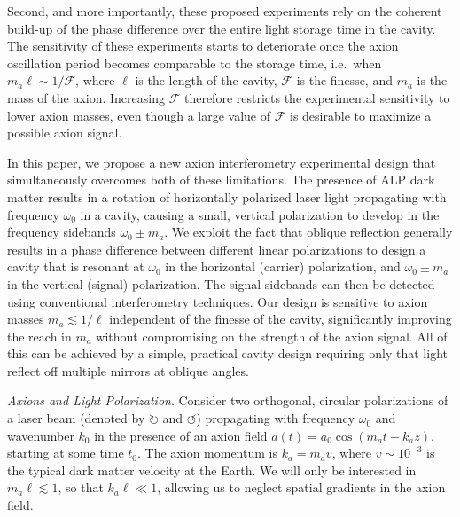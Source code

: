 \documentclass[aps,prd,nofootinbib,twocolumn,superscriptaddress,preprintnumbers,letterpaper, longbibliography]{revtex4-1}
\def\polarc{horizontal }
\def\polars{vertical }
\def\polarcly{horizontally }
\begin{document}
Second, and more importantly, these proposed experiments rely on the coherent build-up of the phase difference over the entire light storage time in the cavity. The sensitivity of these experiments starts to deteriorate once the axion oscillation period becomes comparable to the storage time, i.e.\ when $m_a \ell \sim 1/\mathcal{F}$, where $\ell$ is the length of the cavity, $\mathcal{F}$ is the finesse, and $m_a$ is the mass of the axion. Increasing $\mathcal{F}$ therefore restricts the experimental sensitivity to lower axion masses, even though a large value of $\mathcal{F}$ is desirable to maximize a possible axion signal. 

In this paper, we propose a new axion interferometry experimental design that simultaneously overcomes both of these limitations. The presence of ALP dark matter results in a rotation of \polarcly polarized laser light propagating with frequency $\omega_0$ in a cavity, causing a small, \polars polarization to develop in the frequency sidebands $\omega_0 \pm m_a$. We exploit the fact that oblique reflection generally results in a phase difference between different linear polarizations to design a cavity that is resonant at $\omega_0$ in the \polarc (carrier) polarization, and $\omega_0 \pm m_a$ in the \polars (signal) polarization. The signal sidebands can then be detected using conventional interferometry techniques. Our design is sensitive to axion masses $m_a \lesssim 1/\ell$ independent of the finesse of the cavity, significantly improving the reach in $m_a$ without compromising on the strength of the axion signal. All of this can be achieved by a simple, practical cavity design requiring only that light reflect off multiple mirrors at oblique angles. 

\vspace{0.2cm}
\textit{Axions and Light Polarization}. Consider two orthogonal, circular polarizations of a laser beam (denoted by $\circlearrowright$ and $\circlearrowleft$) propagating with frequency $\omega_0$ and wavenumber $k_0$ in the presence of an axion field $a(t) = a_0 \cos(m_a t - k_a z)$, starting at some time $t_0$. The axion momentum is $k_a = m_a v$, where $v \sim 10^{-3}$ is the typical dark matter velocity at the Earth. We will only be interested in $m_a \ell \lesssim 1$, so that $k_a \ell \ll 1$, allowing us to neglect spatial gradients in the axion field.
\end{document}
